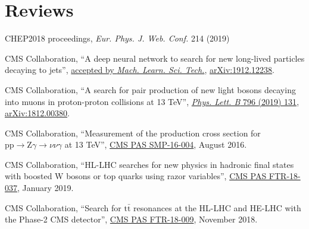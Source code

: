 \section{Reviews}
\begin{description}[leftmargin=12pt,font=\normalfont\textit]
\item[Journal referee:]
\begin{description}[leftmargin=12pt,font=\normalfont,labelsep=0em]\item[]
\item CHEP2018 proceedings, \emph{Eur. Phys. J. Web. Conf.} 214 (2019)
\end{description}
\item[Analysis Review Committee (ARC) member:]
\begin{description}[leftmargin=12pt,font=\normalfont,labelsep=0em]\item[]
\item CMS Collaboration, ``A deep neural network to search for new long-lived particles decaying to jets'', \href{https://doi.org/10.1088/2632-2153/ab9023}{accepted by \emph{Mach. Learn. Sci. Tech.}}, \href{https://arxiv.org/abs/1912.12238}{arXiv:1912.12238}.
\item \begin{sloppypar}CMS Collaboration, ``A search for pair production of new light bosons decaying into muons in proton-proton collisions at 13 TeV'', \href{http://dx.doi.org/10.1016/j.physletb.2019.07.013}{\emph{Phys. Lett. B} 796 (2019) 131}, \href{https://arxiv.org/abs/1812.00380}{arXiv:1812.00380}.\end{sloppypar}
\item CMS Collaboration, ``Measurement of the production cross section for $\text{p}\text{p} \to \text{Z}\gamma \to \nu\nu\gamma$ at 13 TeV'', \href{https://cds.cern.ch/record/2204922}{CMS PAS SMP-16-004}, August 2016.
\end{description}
\item[CMS Certified Language Editor (CCLE):]
\begin{description}[leftmargin=12pt,font=\normalfont,labelsep=0em]\item[]
\item CMS Collaboration, ``HL-LHC searches for new physics in hadronic final states with boosted W bosons or top quarks using razor variables'', \href{https://cds.cern.ch/record/2658262}{CMS PAS FTR-18-037}, January 2019.
\item CMS Collaboration, ``Search for $\text{t}\bar{\text{t}}$ resonances at the HL-LHC and HE-LHC with the Phase-2 CMS detector'', \href{https://cds.cern.ch/record/2649032}{CMS PAS FTR-18-009}, November 2018.

\end{description}
\end{description}
